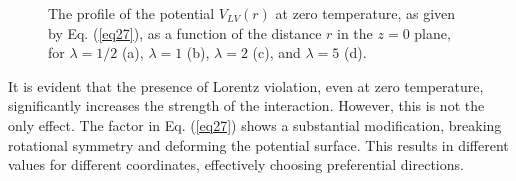 \documentclass[11pt,showpacs,preprintnumbers,amsmath,amssymb,prd,nofootinbib,superscriptaddress]{revtex4-2}
\begin{document}
{\begin{figure}[ht]
    \hfill
    \caption{The profile of the potential $V_{LV}(r)$ at zero temperature, as given by Eq. (\ref{eq27}), as a function of the distance $r$ in the $z=0$ plane, for $\lambda = 1/2$ (a), $\lambda = 1$ (b), $\lambda = 2$ (c), and $\lambda = 5$ (d). }
    \label{fig4}
\end{figure}

It is evident that the presence of Lorentz violation, even at zero temperature, significantly increases the strength of the interaction. However, this is not the only effect. The factor in Eq. (\ref{eq27}) shows a substantial modification, breaking rotational symmetry and deforming the potential surface. This results in different values for different coordinates, effectively choosing preferential directions.

}
\end{document}
